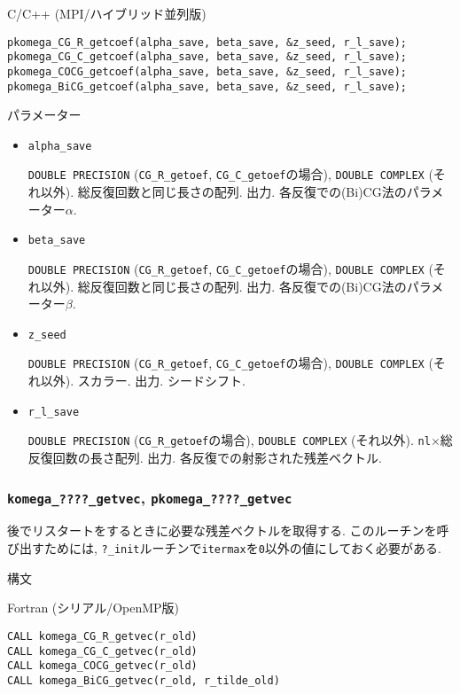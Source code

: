 \documentclass[12pt,titlepage]{jarticle}
\begin{document}
\noindent C/C++ (MPI/ハイブリッド並列版)
\begin{verbatim}
pkomega_CG_R_getcoef(alpha_save, beta_save, &z_seed, r_l_save);
pkomega_CG_C_getcoef(alpha_save, beta_save, &z_seed, r_l_save);
pkomega_COCG_getcoef(alpha_save, beta_save, &z_seed, r_l_save);
pkomega_BiCG_getcoef(alpha_save, beta_save, &z_seed, r_l_save);
\end{verbatim}

\noindent パラメーター

\begin{itemize}
\item \verb|alpha_save|

  \verb|DOUBLE PRECISION| (\verb|CG_R_getoef|, \verb|CG_C_getoef|の場合),
  \verb|DOUBLE COMPLEX| (それ以外).
  総反復回数と同じ長さの配列. 出力. 各反復での(Bi)CG法のパラメーター$\alpha$.

\item \verb|beta_save|

  \verb|DOUBLE PRECISION| (\verb|CG_R_getoef|, \verb|CG_C_getoef|の場合),
  \verb|DOUBLE COMPLEX| (それ以外).
  総反復回数と同じ長さの配列. 出力. 各反復での(Bi)CG法のパラメーター$\beta$.

\item \verb|z_seed|

  \verb|DOUBLE PRECISION| (\verb|CG_R_getoef|, \verb|CG_C_getoef|の場合),
  \verb|DOUBLE COMPLEX| (それ以外).
  スカラー. 出力. シードシフト.

\item \verb|r_l_save|
  
  \verb|DOUBLE PRECISION| (\verb|CG_R_getoef|の場合),
  \verb|DOUBLE COMPLEX| (それ以外).
  \verb|nl|$\times$総反復回数の長さ配列. 出力.
  各反復での射影された残差ベクトル.
\end{itemize}

\subsubsection{\texttt{komega\_????\_getvec}, \texttt{pkomega\_????\_getvec}}

後でリスタートをするときに必要な残差ベクトルを取得する.
このルーチンを呼び出すためには,
\verb|?_init|ルーチンで\verb|itermax|を\verb|0|以外の値にしておく必要がある.

\noindent 構文

\noindent Fortran (シリアル/OpenMP版)
\begin{verbatim}
CALL komega_CG_R_getvec(r_old)
CALL komega_CG_C_getvec(r_old)
CALL komega_COCG_getvec(r_old)
CALL komega_BiCG_getvec(r_old, r_tilde_old)
\end{verbatim}
\end{document}
